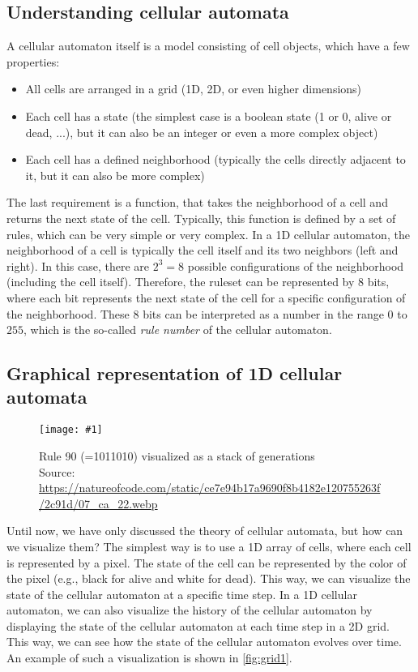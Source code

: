 \documentclass[a4paper,12pt]{llncs}
\numberwithin{equation}{section}
\newcommand{\imagewithwidth}[5]{
  \begin{figure}[htbp]%
    \begin{center}%
      \texttt{[image: \#1]}%
      \caption[#5]{#4}%
      \label{#3}%
    \end{center}%
  \end{figure}
}
\begin{document}
\subsection{Understanding cellular automata}
\label{sec:cellular-automata-understanding}
A cellular automaton itself is a model consisting of cell objects, which have a few properties:
\begin{itemize}
  \item All cells are arranged in a grid (1D, 2D, or even higher dimensions)
  \item Each cell has a state (the simplest case is a boolean state (1 or 0, alive or dead, ...), but it can also be an integer or even a more complex object)
  \item Each cell has a defined neighborhood (typically the cells directly adjacent to it, but it can also be more complex)
\end{itemize}
The last requirement is a function, that takes the neighborhood of a cell and returns the next state of the cell.
Typically, this function is defined by a set of rules, which can be very simple or very complex.
In a 1D cellular automaton, the neighborhood of a cell is typically the cell itself and its two neighbors (left and right).
In this case, there are $2^3=8$ possible configurations of the neighborhood (including the cell itself).
Therefore, the ruleset can be represented by 8 bits, where each bit represents the next state of the cell for a specific configuration of the neighborhood.
These 8 bits can be interpreted as a number in the range $0$ to $255$, which is the so-called \textit{rule number} of the cellular automaton.
\subsection{Graphical representation of 1D cellular automata}
\imagewithwidth{figures/rule90}{\textwidth}{fig:grid1}{Rule 90 (=1011010) visualized as a stack of generations\\Source: \url{https://natureofcode.com/static/ce7e94b17a9690f8b4182e120755263f/2c91d/07_ca_22.webp}}{}
Until now, we have only discussed the theory of cellular automata, but how can we visualize them?
The simplest way is to use a 1D array of cells, where each cell is represented by a pixel.
The state of the cell can be represented by the color of the pixel (e.g., black for alive and white for dead).
This way, we can visualize the state of the cellular automaton at a specific time step.
In a 1D cellular automaton, we can also visualize the history of the cellular automaton by displaying the state of the cellular automaton at each time step in a 2D grid.
This way, we can see how the state of the cellular automaton evolves over time.
An example of such a visualization is shown in \autoref{fig:grid1}.
\end{document}
